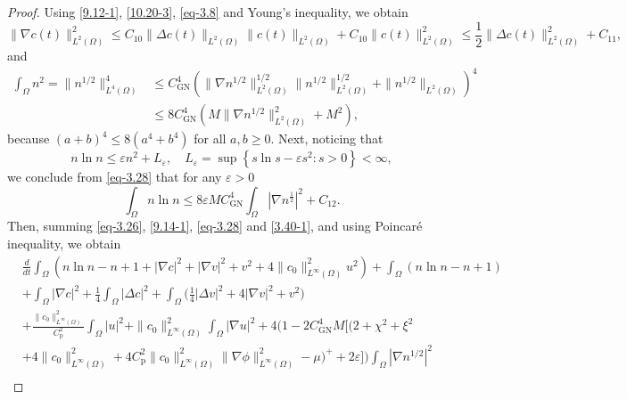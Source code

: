\documentclass[10pt,a4paper]{amsart}
\numberwithin{equation}{section}
\begin{document}
\begin{proof}
Using \eqref{9.12-1}, \eqref{10.20-3}, \eqref{eq-3.8} and Young's inequality, we obtain
\begin{equation}\label{9.14-1}
\|\nabla c(t)\|_{L^2(\Omega)}^2
\leq C_{10} \|\Delta c(t)\|_{L^2(\Omega)} \|c(t)\|_{L^2(\Omega)}
+ C_{10} \|c(t)\|^2_{L^2(\Omega)} 
\leq \frac{1}{2} \|\Delta c(t)\|_{L^2(\Omega)}^2 + C_{11},
\end{equation}
and
\begin{equation}\label{eq-3.28}
\begin{aligned}
\int_{\Omega} n^2 = \| n^{1/2}\|_{L^4(\Omega)}^4
&\leq C_{\mathrm{GN}}^4 ( \| \nabla n^{1/2} \|_{L^2(\Omega)}^{1/2}
\| n^{1/2} \|_{L^2(\Omega)}^{1/2} + \| n^{1/2}\|_{L^2(\Omega)} )^4 \\
&\leq 8 C_{\mathrm{GN}}^4 ( M \| \nabla n^{1/2} \|_{L^2(\Omega)}^2 + M^2),
\end{aligned}
\end{equation}
because $ (a + b)^4 \leq 8(a^4 + b^4) $ for all $ a, b \geq 0$.
Next, noticing that
\[
n\ln n \leq \varepsilon n^2 + L_\varepsilon,\quad 
L_\varepsilon = \sup\left\{ s \ln s - \varepsilon s^2 : s > 0 \right\}<\infty,
\]
we conclude from \eqref{eq-3.28} that for any $\varepsilon>0$
\begin{equation}\label{3.40-1}
\int_{\Omega} n\ln n \leq 8\varepsilon M C_{\mathrm{GN}}^4
\int_{\Omega} |\nabla n^{\frac12}|^2 + C_{12}.
\end{equation}
Then, summing  \eqref{eq-3.26}, \eqref{9.14-1}, \eqref{eq-3.28} and \eqref{3.40-1}, 
and using Poincar\'e inequality, we obtain
\begin{equation}\label{eq-3.30}
\begin{aligned}
&\frac{d}{dt} \int_\Omega \left( n \ln n - n + 1 + |\nabla c|^2 
 + |\nabla v|^2 + v^2+ 4\|c_0\|_{L^\infty(\Omega)}^2 u^2 \right)
 +\int_\Omega \left( n \ln n - n + 1\right)\\ 
&+\int_{\Omega} |\nabla c|^2 +\frac{1}{4}\int_{\Omega} |\Delta c|^2
 +\int_{\Omega}\Big(\frac{1}{4} |\Delta v|^2+4|\nabla v|^2+ v^2\Big) \\
&+\frac{\|c_0\|_{L^\infty(\Omega)}^2}{C^2_{\mathrm{p}}}\int_{\Omega} |u|^2
 +\|c_0\|_{L^\infty(\Omega)}^2\int_{\Omega} |\nabla u|^2  
 + 4 \Big( 1 - 2 C_{\mathrm{GN}}^4 M \Big[ \Big( 2 + \chi^2 + \xi^2 \\
&+ 4\|c_0\|_{L^\infty(\Omega)}^2+ 4 C_{\mathrm{p}}^2\|c_0\|_{L^\infty(\Omega)}^2
  \|\nabla \phi\|_{L^\infty(\Omega)}^2 - \mu \Big)^+ 
  + 2\varepsilon \Big] \Big) \int_{\Omega} | \nabla n^{1/2} |^2 \\

\end{aligned}
\end{equation}
\end{proof}
\end{document}

